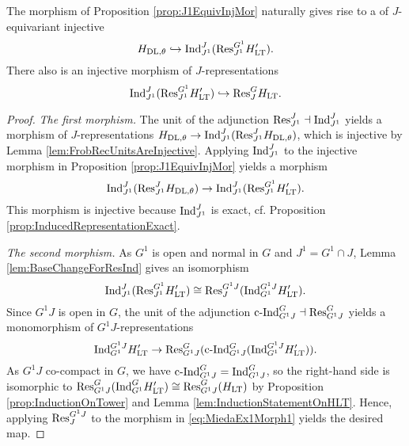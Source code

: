 \documentclass[../main.tex]{subfiles}
\begin{document}
\begin{lem} \label{lem:JEquivInjMor}
  The morphism of Proposition \ref{prop:J1EquivInjMor} naturally gives rise to
  a of $J$-equivariant injective 
  \begin{equation*}
    H_{\mathrm{DL},\theta} \hookrightarrow \mathrm{Ind}_{J^1}^J (\mathrm{Res}_{J^1}^{G^1} H'_{\mathrm{LT}}).
  \end{equation*}
  There also is an injective morphism of $J$-representations
  \begin{equation*}
     \mathrm{Ind}_{J^1}^J (\mathrm{Res}_{J^1}^{G^1} H'_{\mathrm{LT}}) \hookrightarrow \mathrm{Res}_J^G H_{\mathrm{LT}}.
  \end{equation*}
\begin{proof}
  \textit{The first morphism.}
  The unit of the adjunction $\mathrm{Res}_{J^1}^J \dashv \mathrm{Ind}_{J^1}^J$ yields a
  morphism of $J$-representations $H_{\mathrm{DL},\theta} \to \mathrm{Ind}_{J^1}^J(\mathrm{Res}_{J^1}^{J}
  H_{\mathrm{DL}, \theta})$, which is injective by Lemma \ref{lem:FrobRecUnitsAreInjective}.
  Applying $\mathrm{Ind}_{J^1}^J$ to the injective morphism in Proposition
  \ref{prop:J1EquivInjMor} yields a morphism
  \begin{equation*}
    \mathrm{Ind}_{J^1}^J ( \mathrm{Res}_{J^1}^J H_{\mathrm{DL},\theta} ) \to  \mathrm{Ind}_{J^1}^J
    (\mathrm{Res}_{J^1}^{G^1} H'_{\mathrm{LT}}).
  \end{equation*}
  This morphism is injective because $\mathrm{Ind}_{J^1}^J$ is exact, cf. Proposition
  \ref{prop:InducedRepresentationExact}. 

  \textit{The second morphism.} 
  As $G^1$ is open and normal in $G$ and $J^1 = G^1 \cap J$, 
  Lemma \ref{lem:BaseChangeForResInd} gives an isomorphism
  \begin{equation*}
    \mathrm{Ind}_{J^1}^J( \mathrm{Res}_{J^1}^{G^1} H'_{\mathrm{LT}}) \cong \mathrm{Res}_J^{G^1J}(
    \mathrm{Ind}_{G^1}^{G^1J} H'_{\mathrm{LT}}).
  \end{equation*}
  Since $G^1J$ is open in $G$, the unit of the adjunction $\mathrm{c\text{-}Ind}_{G^1J}^G \dashv
  \mathrm{Res}_{G^1J}^G$ yields a monomorphism of $G^1J$-representations 
  \begin{equation}\label{eq:MiedaEx1Morph1}
    \mathrm{Ind}_{G^1}^{G^1J} H_{\mathrm{LT}}' \to \mathrm{Res}_{G^1J}^G
    (\mathrm{c\text{-}Ind}_{G^1J}^G(\mathrm{Ind}_{G^1}^{G^1J} H'_{\mathrm{LT}})).
  \end{equation}
  As $G^1J$ co-compact in $G$, we have $\mathrm{c\text{-}Ind}_{G^1J}^G =
  \mathrm{Ind}_{G^1J}^G$, so the right-hand
  side is isomorphic to $\mathrm{Res}_{G^1J}^G(\mathrm{Ind}_{G^1}^G H'_{\mathrm{LT}}) \cong
  \mathrm{Res}_{G^1J}^G(H_{\mathrm{LT}})$ by Proposition \ref{prop:InductionOnTower} and 
  Lemma \ref{lem:InductionStatementOnHLT}. Hence, applying $\mathrm{Res}_J^{G^1J}$ to the
  morphism in \eqref{eq:MiedaEx1Morph1} yields the desired map.
\end{proof}
\end{lem}
\end{document}

